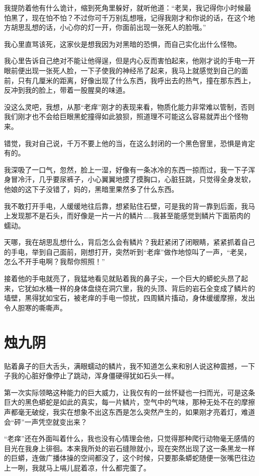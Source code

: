 我提防着他有什么诡计，缩到死角里躲好，就听他道：“老吴，我记得你小时候最怕黑了，现在怕不怕？不过你可千万别乱想哦，记得我刚才和你说的话，在这个地方胡思乱想的话，小心你的灯一开，你面前出现一张死人的脸哦。”

我心里直骂该死，这家伙是想我因为对黑暗的恐惧，而自己实化出什么怪物。

我心里告诉自己绝对不能让他得逞，但是内心反而害怕起来，他刚才说的手电一开眼前便出现一张死人脸，一下子使我的神经吊了起来，我马上就感觉到自己的面前，只有几厘米的距离，好像出现了什么东西，我呼出去的热气，撞在那东西上，反冲到我的脸上，带着一股腥臭的味道。

没这么灵吧，我想，从那“老痒”刚才的表现来看，物质化能力非常难以管制，否则我们刚才也不会给巨眼黑蛇撞得如此狼狈，照道理不可能这么容易就弄出个怪物来。

错觉，我对自己说，千万不要上他的当，在这么封闭的一个黑色窨里，恐惧是肯定有的。

我深吸了一口气，忽然，脸上一湿，好像有一条冰冷的东西一掠而过，我一下子浑身冒冷汗，几乎要尿裤子，小心翼翼地摸了摸胸口，心脏狂跳，只觉得全身发软，他娘的这下子没错了，妈的，黑暗里果然多了什么东西。

我不敢打开手电，人缓缓地往后靠，想紧贴住石壁，可是我的背一靠到后面，我马上发现那不是石头，而好像是一片一片的鳞片……我甚至能感觉到鳞片下面筋肉的蠕动。

天哪，我在胡思乱想什么，背后怎么会有鳞片？我赶紧闭了闭眼睛，紧紧抓着自己的手电，举到自己面前，刚想打开，突然听到“老痒”做作地惊叫了一声，“老吴，怎么不开手电啊？我帮你照照！”

接着他的手电就亮了，我猛地看见就贴着我的鼻子尖，一个巨大的蟒蛇头昂了起来，它犹如水桶一样的身体盘绕在洞穴里，我的头顶、背后的岩石全变成了鳞片的墙壁，黑得犹如宝石，被老痒的手电一惊扰，四周鳞片搐动，身体缓缓摩擦，发出令人胆寒的嘶嘶声。

\chapter{烛九阴}

贴着鼻子的巨大舌头，满眼蠕动的鳞片，我不知道怎么来和别人说这种震撼，一下子我的心脏好像停止了跳动，浑身僵硬得犹如石头一样。

第一次实际领略这种能力的巨大威力，让我仅有的一丝怀疑也一扫而光，可是这条巨大的黑色蟒蛇是如此的真实，每一片鳞片，空气中的气味，那种无处不在的摩擦声都毫无破绽，我实在想象不出这东西是怎么突然产生的，如果刚才亮着灯，难道会“砰”一声凭空就变出来？

“老痒”还在外面叫着什么，我也没有心情理会他，只觉得那种爬行动物毫无感情的目光在我身上徘徊。本来我所处的岩石缝隙就小，现在突然出现了这一条黑龙一样的巨蟒，连做广播体操的空间都没了，这个时候，只要那条蟒蛇随便一张嘴巴往边上一咧，我就马上嗝儿屁着凉，什么都完蛋了。

